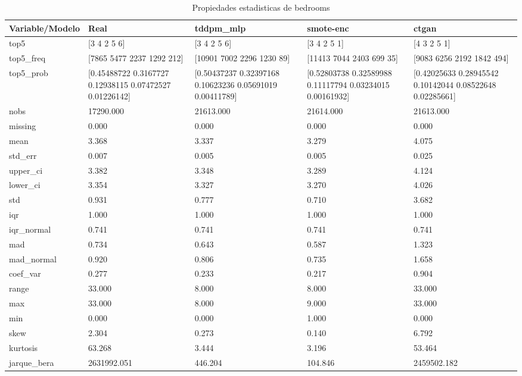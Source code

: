 \begin{table}[H]
\centering
\fontsize{8}{14}\selectfont
\caption{Propiedades  estadisticas de bedrooms}
\label{table-stats-bedrooms}
\begin{tabular}{|l|m{10em}|m{10em}|m{10em}|m{10em}|}
\hline
 \rowcolor[gray]{0.8}
Variable/Modelo & Real & tddpm\_mlp & smote-enc & ctgan \\
\hline top5 & [3 4 2 5 6] & [3 4 2 5 6] & [3 4 2 5 1] & [4 3 2 5 1] \\
\hline top5\_freq & [7865 5477 2237 1292  212] & [10901  7002  2296  1230    89] & [11413  7044  2403   699    35] & [9083 6256 2192 1842  494] \\
\hline top5\_prob & [0.45488722 0.3167727  0.12938115 0.07472527 0.01226142] & [0.50437237 0.32397168 0.10623236 0.05691019 0.00411789] & [0.52803738 0.32589988 0.11117794 0.03234015 0.00161932] & [0.42025633 0.28945542 0.10142044 0.08522648 0.02285661] \\
\hline nobs & 17290.000 & 21613.000 & 21614.000 & 21613.000 \\
\hline missing & 0.000 & 0.000 & 0.000 & 0.000 \\
\hline mean & 3.368 & 3.337 & 3.279 & 4.075 \\
\hline std\_err & 0.007 & 0.005 & 0.005 & 0.025 \\
\hline upper\_ci & 3.382 & 3.348 & 3.289 & 4.124 \\
\hline lower\_ci & 3.354 & 3.327 & 3.270 & 4.026 \\
\hline std & 0.931 & 0.777 & 0.710 & 3.682 \\
\hline iqr & 1.000 & 1.000 & 1.000 & 1.000 \\
\hline iqr\_normal & 0.741 & 0.741 & 0.741 & 0.741 \\
\hline mad & 0.734 & 0.643 & 0.587 & 1.323 \\
\hline mad\_normal & 0.920 & 0.806 & 0.735 & 1.658 \\
\hline coef\_var & 0.277 & 0.233 & 0.217 & 0.904 \\
\hline range & 33.000 & 8.000 & 8.000 & 33.000 \\
\hline max & 33.000 & 8.000 & 9.000 & 33.000 \\
\hline min & 0.000 & 0.000 & 1.000 & 0.000 \\
\hline skew & 2.304 & 0.273 & 0.140 & 6.792 \\
\hline kurtosis & 63.268 & 3.444 & 3.196 & 53.464 \\
\hline jarque\_bera & 2631992.051 & 446.204 & 104.846 & 2459502.182 \\

\end{tabular}
\end{table}
